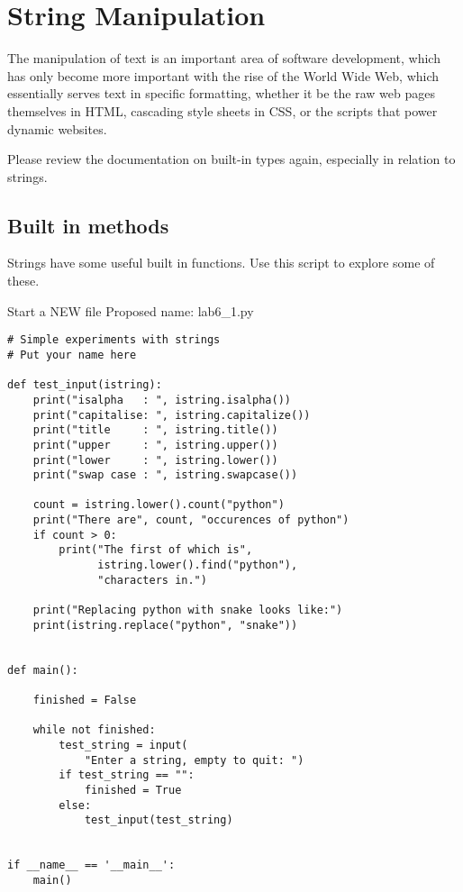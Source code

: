 \documentclass[12pt,oneside]{cttutorial}
\begin{document}
\section{String Manipulation}

The manipulation of text is an important area of software development, which has only become more important with the rise of the World Wide Web, which essentially serves text in specific formatting, whether it be the raw web pages themselves in HTML, cascading style sheets in CSS, or the scripts that power dynamic websites.

Please review the documentation on built-in types again, especially in relation to strings. %

\subsection{Built in methods}

Strings have some useful built in functions. Use this script to explore some of these.

\alert{Start a NEW file}
Proposed name: lab6\_1.py
\begin{lstlisting}
# Simple experiments with strings
# Put your name here

def test_input(istring):
    print("isalpha   : ", istring.isalpha())
    print("capitalise: ", istring.capitalize())
    print("title     : ", istring.title())
    print("upper     : ", istring.upper())
    print("lower     : ", istring.lower())
    print("swap case : ", istring.swapcase())

    count = istring.lower().count("python")
    print("There are", count, "occurences of python")
    if count > 0:
        print("The first of which is",
              istring.lower().find("python"),
              "characters in.")

    print("Replacing python with snake looks like:")
    print(istring.replace("python", "snake"))


def main():

    finished = False

    while not finished:
        test_string = input(
            "Enter a string, empty to quit: ")
        if test_string == "":
            finished = True
        else:
            test_input(test_string)


if __name__ == '__main__':
    main()
\end{lstlisting}
\end{document}

